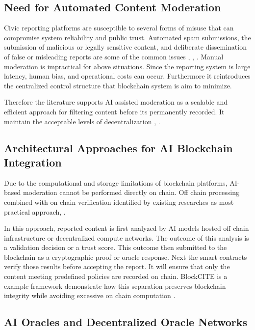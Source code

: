 \subsection{Need for Automated Content Moderation}

Civic reporting platforms are susceptible to several forms of misuse that can compromise system reliability and public trust. Automated spam submissions, the submission of malicious or legally sensitive content, and deliberate dissemination of false or misleading reports are some of the common issues \cite{wani2024ai}, \cite{gosztonyi2024theory}, \cite{kolluri2025aipowered}. Manual moderation is impractical for above situations. Since the reporting system is large latency, human bias, and operational costs can occur. Furthermore it reintroduces the centralized control structure that blockchain system is aim to minimize. 

Therefore the literature supports AI assisted moderation as a scalable and  efficient approach for filtering content before its permanently recorded. It maintain the acceptable levels of decentralization \cite{mohammadi2025ai}, \cite{goundar2025blockchain}.

\subsection{Architectural Approaches for AI Blockchain Integration}

Due to the computational and storage limitations of blockchain platforms, AI-based moderation cannot be performed directly on chain. Off chain processing combined with on chain verification identified by existing researches as most practical approach\cite{goundar2025blockchain}, \cite{kader2024enhancing}.  

In this approach, reported content is first analyzed by AI models hosted off chain infrastructure or decentralized compute networks. The outcome of this analysis is a validation decision or a trust score. This outcome then submitted to the blockchain as a cryptographic proof or oracle response. Next the smart contracts verify those results before accepting the report. It will ensure that only the content meeting predefined policies are recorded on chain. BlockCITE is a example framework demonstrate how this separation preserves blockchain integrity while avoiding excessive on chain computation \cite{li2025blockcite}.

\subsection{\ac{AI} Oracles and Decentralized Oracle Networks}

